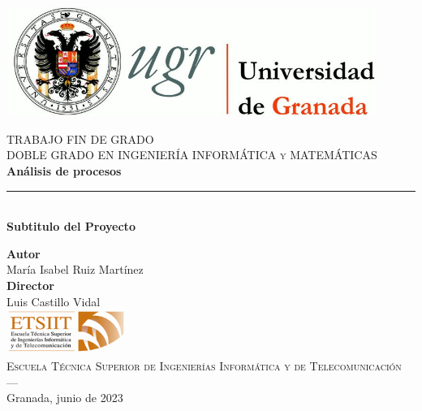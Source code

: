 \begin{titlepage}
 
 
\newlength{\centeroffset}
\setlength{\centeroffset}{-0.5\oddsidemargin}
\addtolength{\centeroffset}{0.5\evensidemargin}
\thispagestyle{empty}

\noindent\hspace*{\centeroffset}\begin{minipage}{\textwidth}

\centering
\includegraphics[width=0.9\textwidth]{imagenes/logos/logo_ugr.jpg}%

\textsc{ \Large TRABAJO FIN DE GRADO\\[0.2cm]}
\textsc{ DOBLE GRADO EN INGENIERÍA INFORMÁTICA y MATEMÁTICAS }\\[1cm]
% 
{\Huge\bfseries Análisis de procesos\\
}
\noindent\rule[-1ex]{\textwidth}{3pt}\\[3.5ex]
{\large\bfseries Subtitulo del Proyecto}
\end{minipage}

\vspace{2.5cm}
\noindent\hspace*{\centeroffset}\begin{minipage}{\textwidth}
\centering

\textbf{Autor}\\ {María Isabel Ruiz Martínez}\\[2.5ex]
\textbf{Director}\\
{Luis Castillo Vidal}\\[2cm]
\includegraphics[width=0.3\textwidth]{imagenes/logos/etsiit_logo.png}\\[0.1cm]
\textsc{Escuela Técnica Superior de Ingenierías Informática y de Telecomunicación}\\
\textsc{---}\\
Granada, junio de 2023
\end{minipage}
\end{titlepage}



